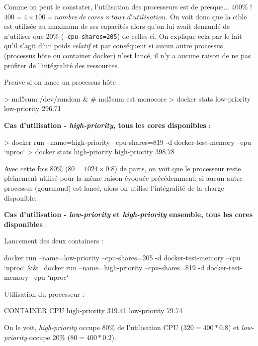 \documentclass[11pt,a4paper,oneside]{report}
\newcommand{\code}[1]{\texttt{#1}}
\begin{document}
Comme on peut le constater, l'utilisation des processeurs est de presque... 400\% ! $400 = 4 \times 100  = nombre\ de\ cores \times taux\ d'utilisation$. On voit donc que la cible est utilisée au maximum de ses capacités alors qu'on lui avait demandé de n'utiliser que 20\% (\code{--cpu-shares=205}) de celles-ci. On explique cela par le fait qu'il s'agit d'un poids \textit{relatif} et par conséquent si aucun autre processus (processus hôte ou container docker) n'est lancé, il n'y a aucune raison de ne pas profiter de l'intégralité des ressources.

Preuve si on lance un processus hôte : 
\begin{bashcode}
> md5sum /dev/random & # md5sum est monocore
> docker stats low-priority
low-priority   296.71%
\end{bashcode}

\textbf{Cas d'utilisation - \textit{high-priority}, tous les cores disponibles} :
\begin{bashcode}
> docker run --name=high-priority --cpu-shares=819 -d docker-test-memory --cpu `nproc`
> docker stats high-priority
high-priority   398.78%
\end{bashcode}

Avec cette fois 80\% ($80 = 1024 \times 0.8$) de parts, on voit que le processeur reste pleinement utilisé pour la même raison évoquée précédemment; si aucun autre processus (gourmand) est lancé, alors on utilise l'intégralité de la charge disponible.


\textbf{Cas d'utilisation - \textit{low-priority} et \textit{high-priority} ensemble, tous les cores disponibles} :

Lancement des deux containers :
\begin{bashcode}
docker run --name=low-priority  --cpu-shares=205 -d docker-test-memory --cpu `nproc` && \
docker run --name=high-priority --cpu-shares=819 -d docker-test-memory --cpu `nproc`
\end{bashcode}

Utilisation du processeur :
\begin{textcode}
CONTAINER      CPU %
high-priority  319.41%
low-priority   79.74%
\end{textcode}

On le voit, \textit{high-priority} occupe 80\% de l'utilisation CPU ($320 = 400 * 0.8$) et \textit{low-priority} occupe 20\% ($80 = 400 * 0.2$).
\end{document}
